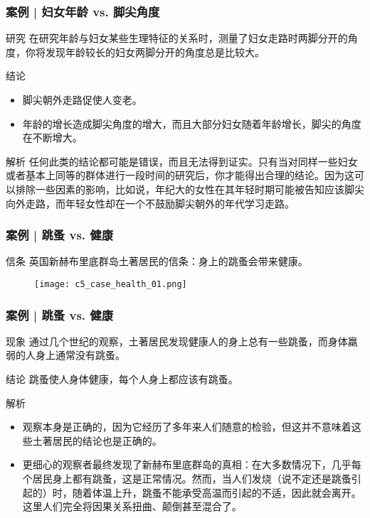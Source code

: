 \begin{frame}
  \frametitle{案例 | 妇女年龄 vs. 脚尖角度}
  \begin{block}{研究}
    在研究年龄与妇女某些生理特征的关系时，测量了妇女走路时两脚分开的角度，你将发现年龄较长的妇女两脚分开的角度总是比较大。
  \end{block}
  \pause
  \begin{block}{结论}
    \begin{itemize}
      \item 脚尖朝外走路促使人变老。
      \item 年龄的增长造成脚尖角度的增大，而且大部分妇女随着年龄增长，脚尖的角度在不断增大。
    \end{itemize}
  \end{block}
  \pause \pause \pause \pause
  \begin{block}{解析}
任何此类的结论都可能是错误，而且无法得到证实。只有当对同样一些妇女或者基本上同等的群体进行一段时间的研究后，你才能得出合理的结论。因为这可以排除一些因素的影响，比如说，年纪大的女性在其年轻时期可能被告知应该脚尖向外走路，而年轻女性却在一个不鼓励脚尖朝外的年代学习走路。
  \end{block}
\end{frame}

\begin{frame}
  \frametitle{案例 | 跳蚤 vs. 健康}
  \begin{block}{信条}
    英国新赫布里底群岛土著居民的信条：身上的跳蚤会带来健康。
  \end{block}
  \begin{figure}
    \centering
    \texttt{[image: c5\_case\_health\_01.png]}
  \end{figure}
\end{frame}

\begin{frame}
  \frametitle{案例 | 跳蚤 vs. 健康}
  \begin{block}{现象}
    通过几个世纪的观察，土著居民发现健康人的身上总有一些跳蚤，而身体羸弱的人身上通常没有跳蚤。
  \end{block}
  \pause
  \begin{block}{结论}
    跳蚤使人身体健康，每个人身上都应该有跳蚤。
  \end{block}
  \pause \pause \pause \pause
  \begin{block}{解析}
    \begin{itemize}
      \item 观察本身是正确的，因为它经历了多年来人们随意的检验，但这并不意味着这些土著居民的结论也是正确的。
      \item 更细心的观察者最终发现了新赫布里底群岛的真相：在大多数情况下，几乎每个居民身上都有跳蚤，这是正常情况。然而，当人们发烧（说不定还是跳蚤引起的）时，随着体温上升，跳蚤不能承受高温而引起的不适，因此就会离开。这里人们完全将因果关系扭曲、颠倒甚至混合了。
    \end{itemize}
  \end{block}
\end{frame}

